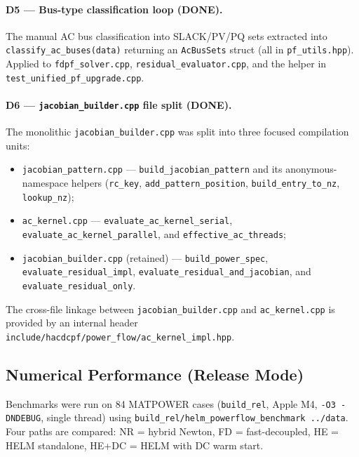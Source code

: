 \paragraph{D5 --- Bus-type classification loop \textnormal{(}\textbf{DONE}\textnormal{)}.}
The manual AC bus classification into SLACK/PV/PQ sets extracted into
\texttt{classify\_ac\_buses(data)} returning an \texttt{AcBusSets} struct
(all in \texttt{pf\_utils.hpp}).  Applied to \texttt{fdpf\_solver.cpp},
\texttt{residual\_evaluator.cpp}, and the helper in
\texttt{test\_unified\_pf\_upgrade.cpp}.

\paragraph{D6 --- \texttt{jacobian\_builder.cpp} file split \textnormal{(}\textbf{DONE}\textnormal{)}.}
The monolithic \texttt{jacobian\_builder.cpp} was split into three focused
compilation units:
\begin{itemize}
  \item \texttt{jacobian\_pattern.cpp} --- \texttt{build\_jacobian\_pattern} and
        its anonymous-namespace helpers (\texttt{rc\_key},
        \texttt{add\_pattern\_position}, \texttt{build\_entry\_to\_nz},
        \texttt{lookup\_nz});
  \item \texttt{ac\_kernel.cpp} --- \texttt{evaluate\_ac\_kernel\_serial},
        \texttt{evaluate\_ac\_kernel\_parallel}, and \texttt{effective\_ac\_threads};
  \item \texttt{jacobian\_builder.cpp} (retained) --- \texttt{build\_power\_spec},
        \texttt{evaluate\_residual\_impl}, \texttt{evaluate\_residual\_and\_jacobian},
        and \texttt{evaluate\_residual\_only}.
\end{itemize}
The cross-file linkage between \texttt{jacobian\_builder.cpp} and
\texttt{ac\_kernel.cpp} is provided by an internal header
\texttt{include/hacdcpf/power\_flow/ac\_kernel\_impl.hpp}.

\subsection{Numerical Performance (Release Mode)}
\label{sec:pf-performance}

Benchmarks were run on 84 MATPOWER cases (\texttt{build\_rel},
Apple M4, \texttt{-O3 -DNDEBUG}, single thread) using
\texttt{build\_rel/helm\_powerflow\_benchmark ../data}.
Four paths are compared: NR = hybrid Newton, FD = fast-decoupled,
HE = HELM standalone, HE+DC = HELM with DC warm start.


